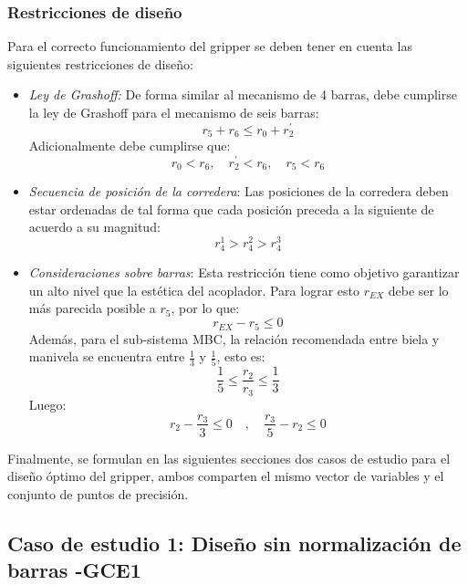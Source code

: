 \subsubsection{Restricciones de diseño}\label{sec:Restricciones de diseño MEC_gripper}
Para el correcto funcionamiento del gripper se deben tener en cuenta las siguientes restricciones de diseño: 
\begin{itemize}
\item \textit{Ley de Grashoff:} De forma similar al mecanismo de 4 barras, debe cumplirse la ley de Grashoff para el mecanismo de seis barras:
\begin{equation}
r_5+r_6 \leq r_0+r^{\prime}_2
\end{equation}
Adicionalmente debe cumplirse que:
\begin{equation}
r_0<r_6, \quad r^{\prime}_2<r_6 ,\quad r_5 < r_6
\end{equation}

\item \textit{Secuencia de posición de la corredera}: Las  posiciones de la corredera deben estar ordenadas de tal forma que cada posición preceda a la siguiente de acuerdo a su magnitud:
\begin{equation}
r^1_4 > r^2_4 > r^3_4
\end{equation}

\item \textit{Consideraciones sobre barras}: Esta restricción tiene como objetivo garantizar un alto nivel que la estética del acoplador. Para lograr esto $r_{EX}$ debe ser lo más parecida posible a $r_5$, por lo que: 
\begin{equation}
 r_{EX} - r_5 \leq 0
\end{equation}
Además, para el sub-sistema MBC, la relación recomendada entre biela y manivela se encuentra entre $\frac{1}{3}$ y $\frac{1}{5}$, esto es:
\begin{equation}
\frac{1}{5} \leq \frac{r_2}{r_3}\leq \frac{1}{3}
\end{equation}
Luego:
\begin{equation}
r_2 -\frac{r_3}{3} \leq 0 \quad , \quad \frac{r_3}{5} -r_2 \leq 0
\end{equation}
\end{itemize}

Finalmente, se formulan en las siguientes secciones dos casos de estudio para  el diseño óptimo del gripper, ambos comparten el mismo vector de variables y el conjunto de puntos de precisión.
\subsection{Caso de estudio 1: Diseño sin normalización de barras -GCE1}

